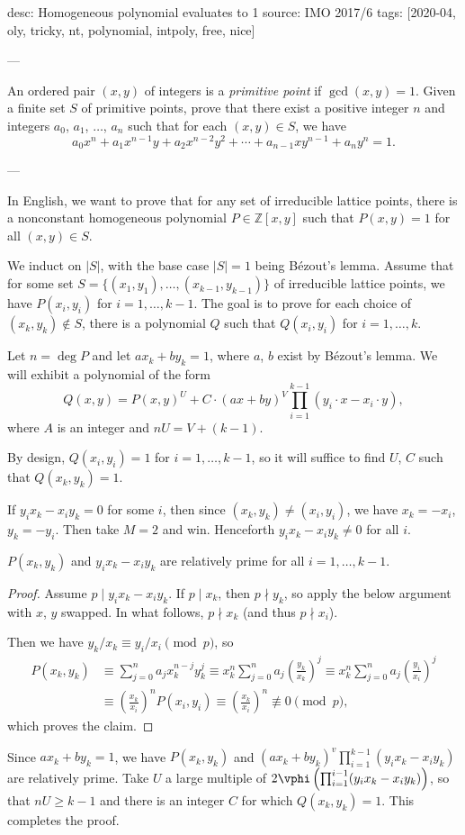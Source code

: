desc: Homogeneous polynomial evaluates to 1
source: IMO 2017/6
tags: [2020-04, oly, tricky, nt, polynomial, intpoly, free, nice]

---

An ordered pair $(x,y)$ of integers is a \emph{primitive point} if $\gcd(x,y)=1$. Given a finite set $S$ of primitive points, prove that there exist a positive integer $n$ and integers $a_0$, $a_1$, $\ldots$, $a_n$ such that for each $(x,y)\in S$, we have \[a_0x^n+a_1x^{n-1}y+a_2x^{n-2}y^2+\cdots+a_{n-1}xy^{n-1}+a_ny^n=1.\]

---

In English, we want to prove that for any set of irreducible lattice points, there is a nonconstant homogeneous polynomial $P\in\mathbb Z[x,y]$ such that $P(x,y)=1$ for all $(x,y)\in S$.

We induct on $|S|$, with the base case $|S|=1$ being B\'ezout's lemma. Assume that for some set $S=\{(x_1,y_1),\ldots,(x_{k-1},y_{k-1})\}$ of irreducible lattice points, we have $P(x_i,y_i)$ for $i=1,\ldots,k-1$. The goal is to prove for each choice of $(x_k,y_k)\notin S$, there is a polynomial $Q$ such that $Q(x_i,y_i)$ for $i=1,\ldots,k$.

Let $n=\deg P$ and let $ax_k+by_k=1$, where $a$, $b$ exist by B\'ezout's lemma. We will exhibit a polynomial of the form \[Q(x,y)=P(x,y)^U+C\cdot(ax+by)^V\prod_{i=1}^{k-1}\left(y_i\cdot x-x_i\cdot y\right),\]
where $A$ is an integer and $nU=V+(k-1)$. 

By design, $Q(x_i,y_i)=1$ for $i=1,\ldots,k-1$, so it will suffice to find $U$, $C$ such that $Q(x_k,y_k)=1$.

If $y_ix_k-x_iy_k=0$ for some $i$, then since $(x_k,y_k)\ne(x_i,y_i)$, we have $x_k=-x_i$, $y_k=-y_i$. Then take $M=2$ and win. Henceforth $y_ix_k-x_iy_k\ne0$ for all $i$.
\begin{claim*}
    $P(x_k,y_k)$ and $y_ix_k-x_iy_k$ are relatively prime for all $i=1,\ldots,k-1$.
\end{claim*}
\begin{proof}
    Assume $p\mid y_ix_k-x_iy_k$. If $p\mid x_k$, then $p\nmid y_k$, so apply the below argument with $x$, $y$ swapped. In what follows, $p\nmid x_k$ (and thus $p\nmid x_i$).

    Then we have $y_k/x_k\equiv y_i/x_i\pmod p$, so
    \begin{align*}
        P(x_k,y_k)&\equiv\sum_{j=0}^na_jx_k^{n-j}y_k^j
        \equiv x_k^n\sum_{j=0}^na_j\left(\frac{y_k}{x_k}\right)^j
        \equiv x_k^n\sum_{j=0}^na_j\left(\frac{y_i}{x_i}\right)^j\\
        &\equiv\left(\frac{x_k}{x_i}\right)^nP(x_i,y_i)
        \equiv\left(\frac{x_k}{x_i}\right)^n
        \not\equiv0\pmod p,
    \end{align*}
    which proves the claim.
\end{proof}

Since $ax_k+by_k=1$, we have $P(x_k,y_k)$ and $(ax_k+by_k)^v\prod_{i=1}^{k-1}(y_ix_k-x_iy_k)$ are relatively prime. Take $U$ a large multiple of $2\vphi\left(\prod_{i=1}^{i-1}(y_ix_k-x_iy_k)\right)$, so that $nU\ge k-1$ and there is an integer $C$ for which $Q(x_k,y_k)=1$. This completes the proof.

